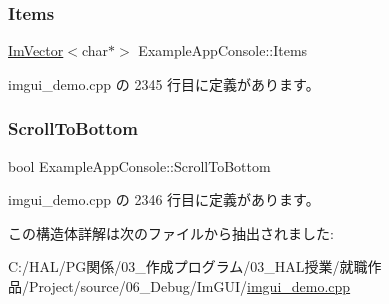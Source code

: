 \subsubsection{\texorpdfstring{Items}{Items}}
{\footnotesize\ttfamily \mbox{\hyperlink{class_im_vector}{Im\+Vector}}$<$char$\ast$$>$ Example\+App\+Console\+::\+Items}



 imgui\+\_\+demo.\+cpp の 2345 行目に定義があります。

\mbox{\label{struct_example_app_console_a69b1406795fd71a3757761b0767ea1c5}} 
\subsubsection{\texorpdfstring{Scroll\+To\+Bottom}{ScrollToBottom}}
{\footnotesize\ttfamily bool Example\+App\+Console\+::\+Scroll\+To\+Bottom}



 imgui\+\_\+demo.\+cpp の 2346 行目に定義があります。



この構造体詳解は次のファイルから抽出されました\+:\begin{DoxyCompactItemize}
\item 
C\+:/\+H\+A\+L/\+P\+G関係/03\+\_\+作成プログラム/03\+\_\+\+H\+A\+L授業/就職作品/\+Project/source/06\+\_\+\+Debug/\+Im\+G\+U\+I/\mbox{\hyperlink{imgui__demo_8cpp}{imgui\+\_\+demo.\+cpp}}\end{DoxyCompactItemize}
